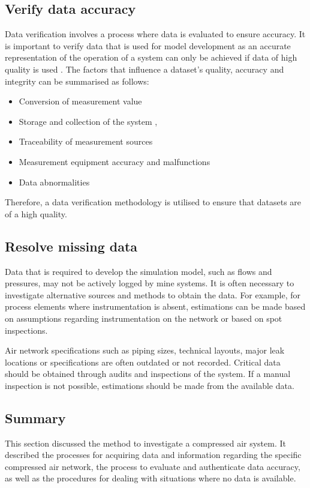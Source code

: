 	\subsection{Verify data accuracy}
	Data verification involves a process where data is evaluated to ensure accuracy. It is important to verify data that is used for model development as an accurate representation of the operation of a system can only be achieved if data of high quality is used \cite{gous2016data}. The factors that influence a dataset's quality, accuracy and integrity can be summarised as follows:
	\begin{itemize}
		\item Conversion of measurement value \cite{meijsen2015verification}
		\item Storage and collection of the system \cite{vanNiekerk2016quantification}, \cite{Jansevan2016structuring}
		\item Traceability of measurement sources \cite{Jansevan2016structuring}
		\item Measurement equipment accuracy and malfunctions \cite{gous2016data}
		\item Data abnormalities \cite{gous2016data}
	\end{itemize} 
	\par 
	Therefore, a data verification methodology is utilised to ensure that datasets are of a high quality. 
	\subsection{Resolve missing data}
		Data that is required to develop the simulation model, such as flows and pressures, may not be actively logged by mine systems. It is often necessary to investigate alternative sources and methods to obtain the data. For example, for process elements where instrumentation is absent, estimations can be made based on assumptions regarding instrumentation on the network or based on spot inspections.
		\par 
		Air network specifications such as piping sizes, technical layouts, major leak locations or specifications are often outdated or not recorded. Critical data should be obtained through audits and inspections of the system. If a manual inspection is not possible, estimations should be made from the available data. %
	
	\subsection{Summary}	
	This section discussed the method to investigate a compressed air system. It described the processes for acquiring data and information regarding the specific compressed air network, the process to evaluate and authenticate data accuracy, as well as the procedures for dealing with situations where no data is available.
